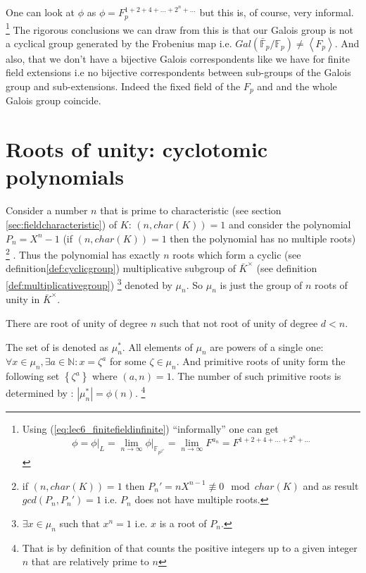 One can look at
$\phi$ as $\phi = F_p^{1+2+4+ \dots + 2^n + \dots}$ but this is, of
course, very informal.
\footnote{
  Using (\ref{eq:lec6_finitefieldinfinite}) ``informally'' one can get
  \[
  \phi = \left.\phi\right|_L =
  \lim_{n \to \infty}\left.\phi\right|_{\mathbb{F}_{p^{2^n}}} =
  \lim_{n \to \infty} F^{a_n} = 
  F^{1
    +2 +4 + \dots + 2^n + \dots}
  \]  
}
The rigorous conclusions we can draw from this
is that our Galois group is not a cyclical group generated by the
Frobenius map i.e.
$Gal\left(\bar{\mathbb{F}}_p/\mathbb{F}_p\right) \ne
\left<F_p\right>$. And also, that we don't have a bijective Galois
correspondents like we have for finite field extensions i.e no
bijective correspondents  between sub-groups 
of the Galois group and sub-extensions. Indeed the fixed field of the
$F_p$ and and the whole Galois group coincide.  

\section{ Roots of unity: cyclotomic polynomials}
Consider a number $n$ that is prime to characteristic (see section
\ref{sec:fieldcharacteristic}) of $K$:
$\left(n, char\left(K\right)\right) = 1$ and consider the polynomial
$P_n = X^n - 1$ (if $\left(n, char\left(K\right)\right) = 1$
then the
polynomial has no multiple roots)
\footnote{
 if $\left(n, char\left(K\right)\right) = 1$ then $P_n' = n X^{n-1}
 \not \equiv 0 \mod char\left(K\right)$ and as result
 $gcd\left(P_n, P_n'\right) = 1$ i.e. $P_n$ does not have multiple
 roots. 
}
. Thus the polynomial has exactly $n$
roots which form a cyclic (see definition\ref{def:cyclicgroup})
multiplicative subgroup of $\bar{K}^\times$ 
(see definition \ref{def:multiplicativegroup})
\footnote{
  $\exists x \in \mu_n$ such that $x^n = 1$ i.e. $x$ is a root of $P_n$.
}
denoted by $\mu_n$. So $\mu_n$ is just the group of $n$ roots of unity
in $\bar{K}^\times$.

\begin{definition}
  There are root of unity of degree $n$ such that not root of unity of
  degree $d < n$.
  \label{def:primitiverootsofunity}
\end{definition}

The set of  is denoted as
$\mu_n^*$. All elements of $\mu_n$ are powers of a single one:
$\forall x \in \mu_n, \exists a \in \mathbb{N}: x = \zeta^a$ for some
$\zeta \in \mu_n$. And primitive roots of unity form the following set
$\left\{\zeta^a\right\}$ where $\left(a, n\right) = 1$. The number of
such primitive roots is determined by :
$\left|\mu_n^*\right| = \phi\left(n\right)$.
\footnote{
  That is by definition of  that counts the
  positive integers up to a given integer $n$ that are relatively
  prime to $n$  
}

